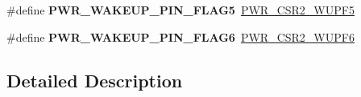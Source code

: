 \begin{DoxyCompactItemize}
\#define {\bfseries P\+W\+R\+\_\+\+W\+A\+K\+E\+U\+P\+\_\+\+P\+I\+N\+\_\+\+F\+L\+A\+G5}~\mbox{\hyperlink{group___peripheral___registers___bits___definition_ga36a1f553a45b09295318eb8db6b51193}{P\+W\+R\+\_\+\+C\+S\+R2\+\_\+\+W\+U\+P\+F5}}
\item 
\mbox{\label{group___p_w_r_ex___wakeup___pins___flag_ga4ae202a41783eec77cd2e2705e4800d7}} 
\#define {\bfseries P\+W\+R\+\_\+\+W\+A\+K\+E\+U\+P\+\_\+\+P\+I\+N\+\_\+\+F\+L\+A\+G6}~\mbox{\hyperlink{group___peripheral___registers___bits___definition_ga978383d85db8be197da1892b223b67ab}{P\+W\+R\+\_\+\+C\+S\+R2\+\_\+\+W\+U\+P\+F6}}
\end{DoxyCompactItemize}


\subsection{Detailed Description}

